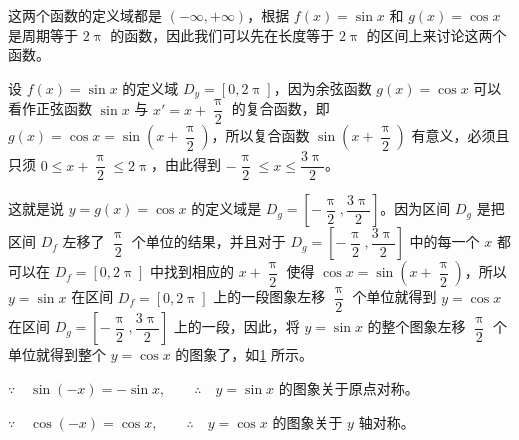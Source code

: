 \begin{solution}
这两个函数的定义域都是 $(-\infty,+\infty)$，根据 $f(x)=\sin x$ 和 $g(x)=\cos x$ 是周期等于 $2\uppi$ 的函数，因此我们可以先在长度等于 $2\uppi$ 的区间上来讨论这两个函数。

{\linespread{2.0}\selectfont
设 $f(x)=\sin x$ 的定义域 $D_y=[0,2\uppi]$，因为余弦函数 $g(x)=\cos x$ 可以看作正弦函数 $\sin x$ 与 $x'=x+\dfrac{\uppi}{2}$ 的复合函数，即 $g(x)=\cos x=\sin\left(x+\dfrac{\uppi}{2}\right)$，所以复合函数 $\sin\left(x+\dfrac{\uppi}{2} \right)$ 有意义，必须且只须 $0\leqslant x+\dfrac{\uppi}{2}\leqslant 2\uppi$，由此得到 $-\dfrac{\uppi}{2}\leqslant x\leqslant \dfrac{3\uppi}{2}$。

这就是说 $y=g(x)=\cos x$ 的定义域是 $D_g=\left[-\dfrac{\uppi}{2},\dfrac{3\uppi}{2}\right]$。因为区间 $D_g$ 是把区间 $D_f$ 左移了 $\dfrac{\uppi}{2}$ 个单位的结果，并且对于 $D_g=\left[-\dfrac{\uppi}{2},\dfrac{3\uppi}{2}\right]$ 中的每一个 $x$ 都可以在 $D_f=[0,2\uppi ]$ 中找到相应的 $x+\dfrac{\uppi}{2}$ 使得 $\cos x=\sin\left(x+\dfrac{\uppi}{2}\right)$，所以 $y=\sin x$ 在区间 $D_f=[0,2\uppi]$ 上的一段图象左移 $\dfrac{\uppi}{2}$ 个单位就得到 $y=\cos x$ 在区间 $D_g=
\left[-\dfrac{\uppi}{2},\dfrac{3\uppi}{2}\right]$ 上的一段，因此，将 $y=\sin x$ 的整个图象左移 $\dfrac{\uppi}{2}$ 个单位就得到整个 $y=\cos x$ 的图象了，如\cref{fig:function_sin} 所示。\par}
\begin{figure}[htp]
    \centering
{}    
    \caption{}\label{fig:function_sin}
\end{figure}

$\because\quad \sin(-x)=-\sin x,\qquad \therefore\quad y=\sin x$ 的图象关于原点对称。

$\because\quad \cos(-x)=\cos x,\qquad \therefore\quad y=\cos x$ 的图象关于 $y$ 轴对称。
\end{solution}

